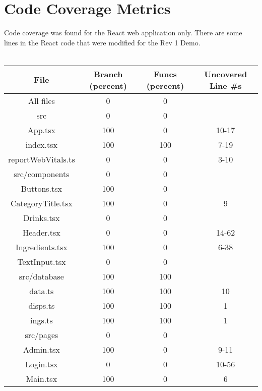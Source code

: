 \documentclass[12pt, titlepage]{article}
\begin{document}
\section{Code Coverage Metrics}
Code coverage was found for the React web application only. There are some lines in the React code that were modified for the Rev 1 Demo.\\\\

\begin{center}
\begin{tabular}{||c | c | c | c|} 
 \hline
File                 &  Branch (percent) &  Funcs (percent) & Uncovered Line #s \\
\hline
All files            &       0 &       0 &   \\
 src                 &        0 &      0 &    \\
  App.tsx            &      100 &       0 &   10-17 \\
  index.tsx          &     100 &   100 &     7-19 \\
  reportWebVitals.ts &        0 &        0 & 3-10 \\
 src/components      &        0 &        0 & \\
  Buttons.tsx        &     100 &            0 &  \\
  CategoryTitle.tsx  &     100 &            0 & 9 \\ 
  Drinks.tsx         &      0 &       0 &      \\
  Header.tsx         &        0 &       0 &       14-62 \\
  Ingredients.tsx    &      100 &       0 &     6-38 \\
  TextInput.tsx      &        0&       0 &     \\
 src/database        &     100&   100&       \\
  data.ts            &    100 &   100&      10 \\
  disps.ts           &       100&     100 &     1 \\
  ings.ts            &      100 &     100 &       1 \\
 src/pages           &        0 &       0&       \\
  Admin.tsx          &       100&       0 & 9-11 \\
  Login.tsx          &         0 &      0&10-56 \\
  Main.tsx           &       100 &       0 &6 \\
 \hline
\end{tabular}
\end{center}
\end{document}
